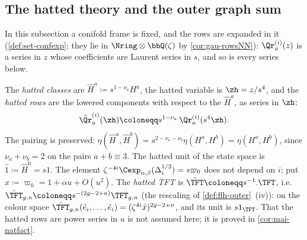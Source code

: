 
\subsection{The hatted theory and the outer graph sum}
\label{sec:set-hat}

In this subsection a conifold frame is fixed, and the rows are expanded in it (\cref{def:set-confexp}; they lie in $\Nring\otimes\bbQ(\zeta)$ by \cref{cor:gau-rowsNN}): $\Qr^{(i)}_a(z)$ is a series in $z$ whose coefficients are Laurent series in $s$, and so is every series below.

\begin{defn}
\label{def:set-hat}
The \emph{hatted classes} are $\hat H^a\coloneqq s^{1-\nu_a}H^a$, the hatted variable is $\zh=z/s^4$, and the \emph{hatted rows} are the lowered components with respect to the $\hat H^a$, as series in $\zh$:
\[
\hat\Qr^{(i)}_a(\zh)\coloneqq s^{1-\nu_a}\,\Qr^{(i)}_a(s^4\zh).
\]
The pairing is preserved: $\eta(\hat H^a,\hat H^b)=s^{2-\nu_a-\nu_b}\eta(H^a,H^b)=\eta(H^a,H^b)$, since $\nu_a+\nu_b=2$ on the pairs $a+b\equiv3$. The hatted unit of the state space is $\hat1\coloneqq\hat H^0=s1$. The element $\zeta^{-4i}\Cexp_{\alpha,\beta}(\Delta_i^{1/2})=s\varpi_0$ does not depend on $i$; put $\hat x\coloneqq\varpi_0=1+\alpha u+O(u^2)$. The \emph{hatted TFT} is $\hat\TFT\coloneqq s^{-1}.\TFT$, i.e.\ $\hat\TFT_{g,n}\coloneqq s^{-(2g-2+n)}\TFT_{g,n}$ (the rescaling of \cref{def:flh-outer}~(iv)): on the colour space $\hat\TFT_{g,n}(\tilde e_i,\dots,\tilde e_i)=(\zeta^{4i}\hat x)^{2g-2+n}$, and its unit is $s1_{\TFT}$. That the hatted rows are power series in $u$ is not assumed here; it is proved in \cref{cor:mai-natfact}.
\end{defn}

